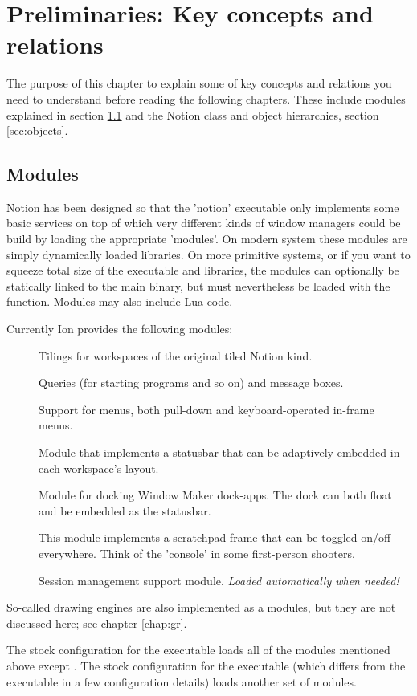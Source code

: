 
\chapter{Preliminaries: Key concepts and relations}
\label{chap:prelim}

The purpose of this chapter to explain some of key concepts and
relations you need to understand before reading the following
chapters. These include modules explained in section \ref{sec:modules}
and the Notion class and object hierarchies, section \ref{sec:objects}.


\section{Modules}
\label{sec:modules}

Notion has been designed so that the 'notion' executable only implements some
basic services on top of which very different kinds of window managers
could be build by loading the appropriate 'modules'. On modern system
these modules are simply dynamically loaded  libraries. On 
more primitive systems, or if you want to squeeze total size of the 
executable and libraries, the modules can optionally be statically 
linked to the main binary, but must nevertheless be loaded with the
 function. Modules may also include Lua code.

Currently Ion provides the following modules:

\begin{description}
    \item[] Tilings for workspaces of the original tiled
       Notion kind.
    \item[] Queries (for starting programs and so on)
      and message boxes.
    \item[] Support for menus, both pull-down and
      keyboard-operated in-frame menus.
    \item[] Module that implements a statusbar that
      can be adaptively embedded in each workspace's layout.
    \item[] Module for docking Window Maker dock-apps.
      The dock can both float and be embedded as the statusbar.
    \item[] This module implements a scratchpad frame that can
      be toggled on/off everywhere. Think of the 'console' in some 
      first-person shooters.
    \item[] Session management support module.
      \emph{Loaded automatically when needed!}
\end{description}

So-called drawing engines are also implemented as a modules,
but they are not discussed here; see chapter \ref{chap:gr}.

The stock configuration for the  executable loads all of the 
modules mentioned above except .
The stock configuration for the  executable (which differs
from the  executable in a few configuration details)
loads another set of modules.



